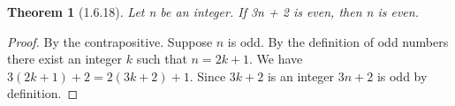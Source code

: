 \documentclass[a4paper, 12pt]{article}
\theoremstyle{plain}
\newtheorem*{theorem*}{Theorem}
\begin{document}
	
	\begin{theorem*}[1.6.18]
		Let n be an integer. If 3n + 2 is even, then n is even.
	\end{theorem*}
	
	\begin{proof}
		By the contrapositive. Suppose $n$ is odd. By the definition of odd numbers there exist an integer $k$ such that $n = 2k + 1$. We have \newline $3(2k + 1) + 2 = 2(3k + 2) + 1$. Since $3k + 2$ is an integer $3n + 2$ is odd by definition.
	\end{proof}
\end{document}
